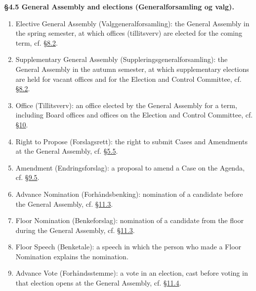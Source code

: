 \documentclass{../../../Common/Latex/Templates/rapport}
\begin{document}
\textbf{\S 4.5 General Assembly and elections (Generalforsamling og valg).}\label{bylaw:4.5}
\begin{enumerate}
  \item Elective General Assembly (Valggeneralforsamling): the General Assembly in the spring semester, at which offices (tillitsverv) are elected for the coming term, cf. \hyperref[bylaw:8.2]{\S 8.2}.
  \item Supplementary General Assembly (Suppleringsgeneralforsamling): the General Assembly in the autumn semester, at which supplementary elections are held for vacant offices and for the Election and Control Committee, cf. \hyperref[bylaw:8.2]{\S 8.2}.
  \item Office (Tillitsverv): an office elected by the General Assembly for a term, including Board offices and offices on the Election and Control Committee, cf. \hyperref[bylaw:10]{\S 10}.
  \item Right to Propose (Forslagsrett): the right to submit Cases and Amendments at the General Assembly, cf. \hyperref[bylaw:5.5]{\S 5.5}.
  \item Amendment (Endringsforslag): a proposal to amend a Case on the Agenda, cf. \hyperref[bylaw:9.5]{\S 9.5}.
  \item Advance Nomination (Forhåndsbenking): nomination of a candidate before the General Assembly, cf. \hyperref[bylaw:11.3]{\S 11.3}.
  \item Floor Nomination (Benkeforslag): nomination of a candidate from the floor during the General Assembly, cf. \hyperref[bylaw:11.3]{\S 11.3}.
  \item Floor Speech (Benketale): a speech in which the person who made a Floor Nomination explains the nomination.
  \item Advance Vote (Forhåndsstemme): a vote in an election, cast before voting in that election opens at the General Assembly, cf. \hyperref[bylaw:11.4]{\S 11.4}.
\end{enumerate}
\end{document}
